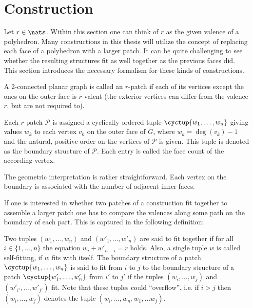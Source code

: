 \section{Construction}

Let $r \in \nats$. Within this section one can think of $r$ as the given valence of a polyhedron. Many constructions in this thesis will utilize the concept of replacing each face of a polyhedron with a larger patch. It can be quite challenging to see whether the resulting structures fit as well together as the previous faces did. This section introduces the necessary formalism for these kinds of constructions.

\begin{definition}[Patch] A $2$-connected planar graph is called an $r$-patch if each of its vertices except the ones on the outer face is $r$-valent (the exterior vertices can differ from the valence $r$, but are not required to).
\end{definition}

\begin{definition} Each $r$-patch $\mathcal{P}$ is assigned a cyclically ordered tuple $\cyctup{w_1, \dots, w_n}$ giving values $w_k$ to each vertex $v_k$ on the outer face of $G$, where $w_k = \deg(v_k) - 1$ and the natural, positive order on the vertices of $\mathcal{P}$ is given. This tuple is denoted as the boundary structure of $\mathcal{P}$. Each entry is called the face count of the according vertex.
\end{definition}

The geometric interpretation is rather straightforward. Each vertex on the boundary is associated with the number of adjacent inner faces.

If one is interested in whether two patches of a construction fit together to assemble a larger patch one has to compare the valences along some path on the boundary of each part. This is captured in the following definition:
\begin{definition}
  Two tuples $(w_1, \dots, w_n)$ and $(w'_1, \dots, w'_n)$ are said to fit together if for all $i \in \{1, \dots, n \}$ the equation $w_i + w'_{n-i} = r$ holds. Also, a single tuple $w$ is called self-fitting, if $w$ fits with itself. The boundary structure of a patch $\cyctup{w_1, \dots, w_n}$ is said to fit from $i$ to $j$ to the boundary structure of a patch $\cyctup{w'_1, \dots, w'_n}$ from $i'$ to $j'$ if the tuples $(w_i, \dots, w_j)$ and $(w'_{i'}, \dots, w'_{j'})$ fit. Note that these tuples could ``overflow'', i.e. if $i > j$ then $(w_i, \dots, w_j)$ denotes the tuple $(w_i, \dots, w_n, w_1, \dots w_j)$.
\end{definition}

